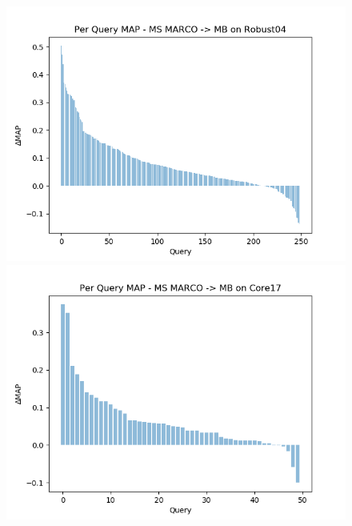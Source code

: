 \begin{figure}[t!]
	\centering
    \begin{minipage}{0.33\textwidth}
        \centering
        \includegraphics[width=\textwidth]{figures/perquery1.png}
    \end{minipage}\hfill
    \begin{minipage}{0.33\textwidth}
        \centering
        \includegraphics[width=\textwidth]{figures/perquery2.png}
    \end{minipage}\hfill
    \begin{minipage}{0.33\textwidth}
        \centering

\end{minipage}
\end{figure}
